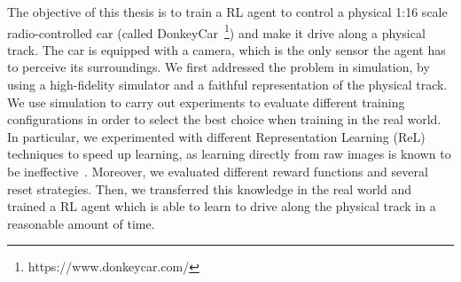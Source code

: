 
The objective of this thesis is to train a RL agent to control a physical 1:16 scale radio-controlled car (called DonkeyCar~\footnote{https://www.donkeycar.com/}) and make it drive along a physical track. The car is equipped with a camera, which is the only sensor the agent has to perceive its surroundings. We first addressed the problem in simulation, by using a high-fidelity simulator and a faithful representation of the physical track. We use simulation to carry out experiments to evaluate different training configurations in order to select the best choice when training in the real world. In particular, we experimented with different Representation Learning (ReL) techniques to speed up learning, as learning directly from raw images is known to be ineffective~\cite{DBLP:journals/corr/abs-2008-00715}. Moreover, we evaluated different reward functions and several reset strategies. Then, we transferred this knowledge in the real world and trained a RL agent which is able to learn to drive along the physical track in a reasonable amount of time.

